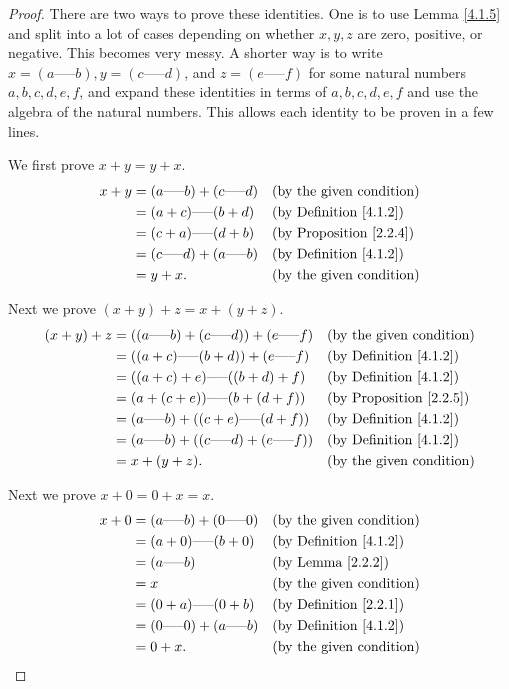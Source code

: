\begin{proof}
There are two ways to prove these identities.
One is to use Lemma \ref{4.1.5} and split into a lot of cases depending on whether \(x, y, z\) are zero, positive, or negative.
This becomes very messy.
A shorter way is to write \(x = (a \text{-----} b), y = (c \text{-----} d)\), and \(z = (e \text{-----} f)\) for some natural numbers \(a, b, c, d, e, f\), and expand these identities in terms of \(a, b, c, d, e, f\) and use the algebra of the natural numbers.
This allows each identity to be proven in a few lines.

We first prove \(x + y = y + x\).
\begin{align*}
x + y &= (a \text{-----} b) + (c \text{-----} d) && \text{(by the given condition)} \\
&= (a + c) \text{-----} (b + d) && \text{(by Definition \ref{4.1.2})} \\
&= (c + a) \text{-----} (d + b) && \text{(by Proposition \ref{2.2.4})} \\
&= (c \text{-----} d) + (a \text{-----} b) && \text{(by Definition \ref{4.1.2})} \\
&= y + x. && \text{(by the given condition)}
\end{align*}

Next we prove \((x + y) + z = x + (y + z)\).
\begin{align*}
(x + y) + z &= ((a \text{-----} b) + (c \text{-----} d)) + (e \text{-----} f) && \text{(by the given condition)} \\
&= ((a + c) \text{-----} (b + d)) + (e \text{-----} f) && \text{(by Definition \ref{4.1.2})} \\
&= ((a + c) + e) \text{-----} ((b + d) + f) && \text{(by Definition \ref{4.1.2})} \\
&= (a + (c + e)) \text{-----} (b + (d + f)) && \text{(by Proposition \ref{2.2.5})} \\
&= (a \text{-----} b) + ((c + e) \text{-----} (d + f)) && \text{(by Definition \ref{4.1.2})} \\
&= (a \text{-----} b) + ((c \text{-----} d) + (e \text{-----} f)) && \text{(by Definition \ref{4.1.2})} \\
&= x + (y + z). && \text{(by the given condition)}
\end{align*}

Next we prove \(x + 0 = 0 + x = x\).
\begin{align*}
x + 0 &= (a \text{-----} b) + (0 \text{-----} 0) && \text{(by the given condition)} \\
&= (a + 0) \text{-----} (b + 0) && \text{(by Definition \ref{4.1.2})} \\
&= (a \text{-----} b) && \text{(by Lemma \ref{2.2.2})} \\
&= x && \text{(by the given condition)} \\
&= (0 + a) \text{-----} (0 + b) && \text{(by Definition \ref{2.2.1})} \\
&= (0 \text{-----} 0) + (a \text{-----} b) && \text{(by Definition \ref{4.1.2})} \\
&= 0 + x. && \text{(by the given condition)}
\end{align*}


\end{proof}
